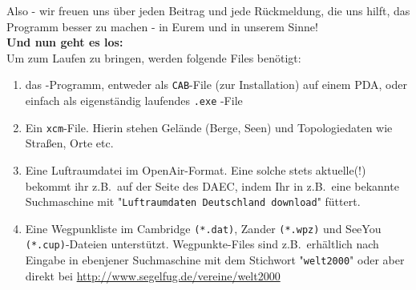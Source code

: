 Also - wir freuen uns über jeden Beitrag und jede Rückmeldung, die uns hilft, das Programm besser zu machen - in Eurem und in unserem Sinne!\\[1em]


\large{\textbf{Und nun geht es los: }}\\[1em]

Um \xc  zum Laufen zu bringen, werden folgende Files benötigt:
\begin{enumerate}\i
\item das \xc -Programm, entweder als \texttt{CAB}-File (zur Installation) auf einem PDA, oder einfach als eigenständig laufendes \texttt{.exe} -File
\item Ein \texttt{xcm}-File. Hierin stehen Gelände (Berge, Seen) und Topologiedaten wie Straßen, Orte etc.\
\item Eine Luftraumdatei im \textsf{OpenAir}-Format. Eine solche stets aktuelle(!) bekommt ihr z.B.\ auf der Seite des \textsc{DAEC}, indem Ihr in z.B.\ eine bekannte Suchmaschine mit "\texttt{Luftraumdaten Deutschland download}" füttert.
\item Eine Wegpunkliste im Cambridge  \texttt{(*.dat)}, Zander  \texttt{(*.wpz)} und SeeYou \texttt{(*.cup)}-Dateien unterstützt.
Wegpunkte-Files sind z.B.\ erhältlich nach Eingabe in ebenjener Suchmaschine mit dem Stichwort "\texttt{welt2000}" oder aber direkt bei \url{http://www.segelfug.de/vereine/welt2000}
\end{enumerate}

